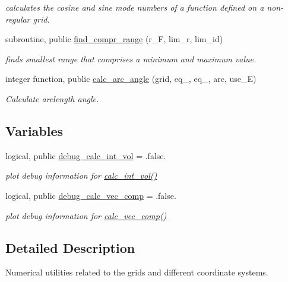 \begin{DoxyCompactItemize}
\begin{DoxyCompactList}\small\item\em calculates the cosine and sine mode numbers of a function defined on a non-\/regular grid. \end{DoxyCompactList}\item 
subroutine, public \hyperlink{namespacegrid__utilities_ae08e1ff213071c9d411a9b9c76035e1e}{find\+\_\+compr\+\_\+range} (r\+\_\+F, lim\+\_\+r, lim\+\_\+id)
\begin{DoxyCompactList}\small\item\em finds smallest range that comprises a minimum and maximum value. \end{DoxyCompactList}\item 
integer function, public \hyperlink{namespacegrid__utilities_ac32a26bff5c635678f3f78ec9a540a65}{calc\+\_\+arc\+\_\+angle} (grid, eq\+\_, eq\+\_, arc, use\+\_\+E)
\begin{DoxyCompactList}\small\item\em Calculate arclength angle. \end{DoxyCompactList}\end{DoxyCompactItemize}
\subsection*{Variables}
\begin{DoxyCompactItemize}
\item 
logical, public \hyperlink{namespacegrid__utilities_a0743c0341d508034b14aee614fa4f8a9}{debug\+\_\+calc\+\_\+int\+\_\+vol} = .false.
\begin{DoxyCompactList}\small\item\em plot debug information for \hyperlink{namespacegrid__utilities_a97e3106dbdc10b726af74afa113ba533}{calc\+\_\+int\+\_\+vol()} \end{DoxyCompactList}\item 
logical, public \hyperlink{namespacegrid__utilities_ab420036236dc8a9a69e180550499d95b}{debug\+\_\+calc\+\_\+vec\+\_\+comp} = .false.
\begin{DoxyCompactList}\small\item\em plot debug information for \hyperlink{namespacegrid__utilities_ad3d9386b9abcb1a7e17369a1b3a3750d}{calc\+\_\+vec\+\_\+comp()} \end{DoxyCompactList}\end{DoxyCompactItemize}


\subsection{Detailed Description}
Numerical utilities related to the grids and different coordinate systems. 

